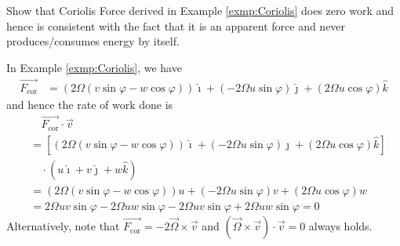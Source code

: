 \begin{Exercise}
Show that Coriolis Force derived in Example \ref{exmp:Coriolis} does zero work and hence is consistent with the fact that it is an apparent force and never produces/consumes energy by itself.
\end{Exercise}
\begin{Answer}
In Example \ref{exmp:Coriolis}, we have
\begin{align*}
\overrightarrow{F_\text{cor}} &= (2\Omega(v\sin\varphi - w\cos\varphi))\hat{\imath} + (-2\Omega u\sin\varphi)\hat{\jmath} + (2\Omega u\cos\varphi)\hat{k}    
\end{align*}
and hence the rate of work done is
\begin{align*}
&\quad \overrightarrow{F_\text{cor}} \cdot \vec{v} \\
&= [(2\Omega(v\sin\varphi - w\cos\varphi))\hat{\imath} + (-2\Omega u\sin\varphi)\hat{\jmath} + (2\Omega u\cos\varphi)\hat{k}] \\
&\quad \cdot (u\hat{\imath} + v\hat{\jmath} + w\hat{k}) \\
&= (2\Omega(v\sin\varphi - w\cos\varphi))u + (-2\Omega u\sin\varphi)v + (2\Omega u\cos\varphi)w \\
&= 2\Omega uv\sin\varphi - 2\Omega uw\sin\varphi - 2\Omega uv\sin\varphi + 2\Omega uw\sin\varphi = 0
\end{align*}
Alternatively, note that $\overrightarrow{F_\text{cor}} = -2\overrightarrow{\Omega} \times \vec{v}$ and $(\overrightarrow{\Omega} \times \vec{v}) \cdot \vec{v} = 0$ always holds.
\end{Answer}